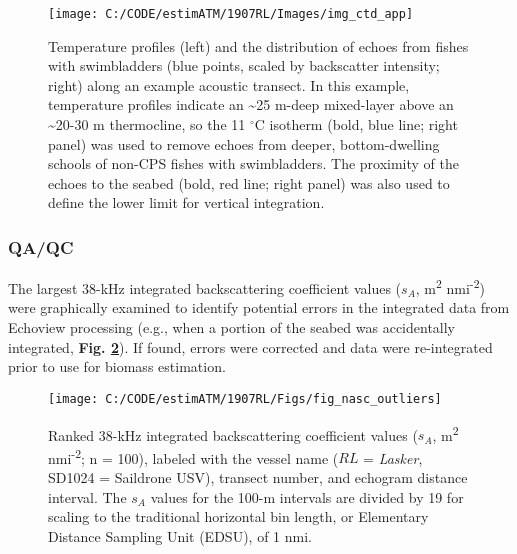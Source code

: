 \documentclass[]{article}
\begin{document}
\newpage



\begin{figure}[H]

{\centering \texttt{[image: C:/CODE/estimATM/1907RL/Images/img\_ctd\_app]} 

}

\caption{Temperature profiles (left) and the distribution of echoes from fishes with swimbladders (blue points, scaled by backscatter intensity; right) along an example acoustic transect. In this example, temperature profiles indicate an \textasciitilde25 m-deep mixed-layer above an \textasciitilde20-30 m thermocline, so the 11 \(^{\circ}\textrm{C}\) isotherm (bold, blue line; right panel) was used to remove echoes from deeper, bottom-dwelling schools of non-CPS fishes with swimbladders. The proximity of the echoes to the seabed (bold, red line; right panel) was also used to define the lower limit for vertical integration.}\label{fig:ctd-app}
\end{figure}

\hypertarget{methods-acoustics-qaqc}{%
\subsubsection{QA/QC}\label{methods-acoustics-qaqc}}

The largest 38-kHz integrated backscattering coefficient values (\(s_A\), m\textsuperscript{2} nmi\textsuperscript{-2}) were graphically examined to identify potential errors in the integrated data from Echoview processing (e.g., when a portion of the seabed was accidentally integrated, \textbf{Fig. \ref{fig:nasc-outliers}}). If found, errors were corrected and data were re-integrated prior to use for biomass estimation.



\begin{figure}[H]

{\centering \texttt{[image: C:/CODE/estimATM/1907RL/Figs/fig\_nasc\_outliers]} 

}

\caption{Ranked 38-kHz integrated backscattering coefficient values (\(s_A\), m\textsuperscript{2} nmi\textsuperscript{-2}; n = 100), labeled with the vessel name (\(RL\) = \emph{Lasker}, SD1024 = Saildrone USV), transect number, and echogram distance interval. The \(s_A\) values for the 100-m intervals are divided by 19 for scaling to the traditional horizontal bin length, or Elementary Distance Sampling Unit (EDSU), of 1 nmi.}\label{fig:nasc-outliers}
\end{figure}
\end{document}
